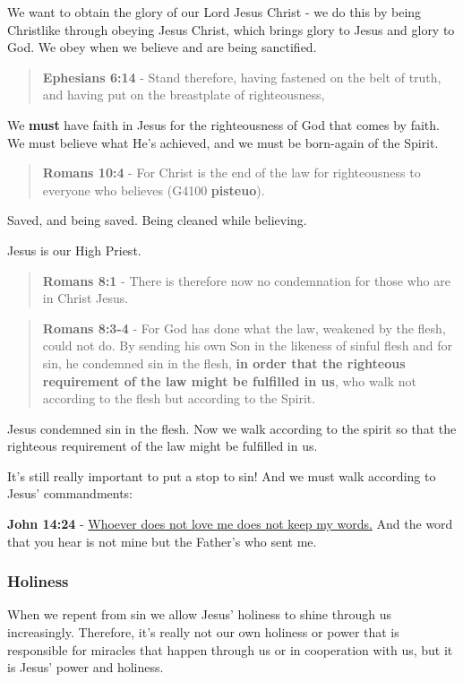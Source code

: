 \documentclass[11pt]{article}
\begin{document}
We want to obtain the glory of our Lord Jesus Christ - we do this by being Christlike through obeying Jesus Christ, which brings glory to Jesus and glory to God. We obey when we believe and are being sanctified.

\begin{quote}
\textbf{Ephesians 6:14} - Stand therefore, having fastened on the belt of truth, and having put on the breastplate of righteousness,
\end{quote}

We \textbf{must} have faith in Jesus for the righteousness of God that comes by faith.
We must believe what He's achieved, and we must be born-again of the Spirit.

\begin{quote}
\textbf{Romans 10:4} - For Christ is the end of the law for righteousness to everyone who believes (G4100 \textbf{pisteuo}).
\end{quote}

Saved, and being saved. Being cleaned while believing.

Jesus is our High Priest.

\begin{quote}
\textbf{Romans 8:1} - There is therefore now no condemnation for those who are in Christ Jesus.
\end{quote}

\begin{quote}
\textbf{Romans 8:3-4} - For God has done what the law, weakened by the flesh, could not do. By sending his own Son in the likeness of sinful flesh and for sin, he condemned sin in the flesh, \textbf{in order that the righteous requirement of the law might be fulfilled in us}, who walk not according to the flesh but according to the Spirit.
\end{quote}

Jesus condemned sin in the flesh. Now we walk according to the spirit so that the righteous requirement of the law might be fulfilled in us.

It's still really important to put a stop to sin! And we must walk according to Jesus' commandments:

\textbf{John 14:24} - \uline{Whoever does not love me does not keep my words.} And the word that you hear is not mine but the Father's who sent me.

\subsubsection{Holiness}
\label{sec:org935b0bc}
When we repent from sin we allow Jesus' holiness to shine through us increasingly.
Therefore, it's really not our own holiness or power that is responsible for miracles that happen through us or in cooperation with us, but it is Jesus' power and holiness.
\end{document}
